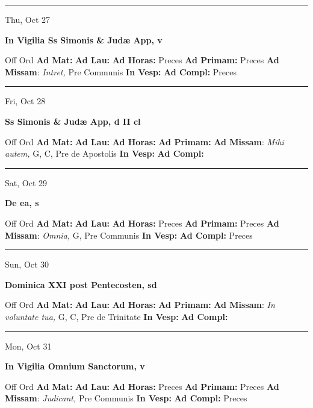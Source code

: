 \documentclass[letterpaper, 10pt]{article}
\begin{document}
\hrule
\begin{center}
Thu, Oct 27
\end{center}\textbf{ \large In Vigilia Ss Simonis \& Judæ App, \textnormal{\normalsize v}}
\begin{justify}
Off Ord
\textbf{Ad Mat: }
\textbf{Ad Lau: }
\textbf{Ad Horas: }Preces
\textbf{Ad Primam: }Preces
\textbf{Ad Missam}: \textit{Intret,} Pre Communis
\textbf{In Vesp: }
\textbf{Ad Compl: }Preces\end{justify}



\hrule
\begin{center}
Fri, Oct 28
\end{center}\textbf{ \large Ss Simonis \& Judæ App, \textnormal{\normalsize d II cl}}
\begin{justify}
Off Ord
\textbf{Ad Mat: }
\textbf{Ad Lau: }
\textbf{Ad Horas: }
\textbf{Ad Primam: }
\textbf{Ad Missam}: \textit{Mihi autem,} G, C, Pre de Apostolis
\textbf{In Vesp: }
\textbf{Ad Compl: }\end{justify}



\hrule
\begin{center}
Sat, Oct 29
\end{center}\textbf{ \large De ea, \textnormal{\normalsize s}}
\begin{justify}
Off Ord
\textbf{Ad Mat: }
\textbf{Ad Lau: }
\textbf{Ad Horas: }Preces
\textbf{Ad Primam: }Preces
\textbf{Ad Missam}: \textit{Omnia,} G, Pre Communis
\textbf{In Vesp: }
\textbf{Ad Compl: }Preces\end{justify}



\hrule
\begin{center}
Sun, Oct 30
\end{center}\textbf{ \large Dominica XXI post Pentecosten, \textnormal{\normalsize sd}}
\begin{justify}
Off Ord
\textbf{Ad Mat: }
\textbf{Ad Lau: }
\textbf{Ad Horas: }
\textbf{Ad Primam: }
\textbf{Ad Missam}: \textit{In voluntate tua,} G, C, Pre de Trinitate
\textbf{In Vesp: }
\textbf{Ad Compl: }\end{justify}



\hrule
\begin{center}
Mon, Oct 31
\end{center}\textbf{ \large In Vigilia Omnium Sanctorum, \textnormal{\normalsize v}}
\begin{justify}
Off Ord
\textbf{Ad Mat: }
\textbf{Ad Lau: }
\textbf{Ad Horas: }Preces
\textbf{Ad Primam: }Preces
\textbf{Ad Missam}: \textit{Judicant,} Pre Communis
\textbf{In Vesp: }
\textbf{Ad Compl: }Preces\end{justify}
\end{document}
